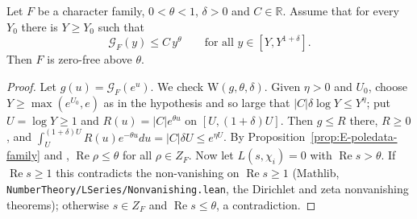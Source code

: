 
\begin{theorem}\label{pn:P023}

\par{}\par
Let $F$ be a character family, $0<\theta<1$, $\delta>0$ and $C\in\mathbb R$. Assume that for every
$Y_0$ there is $Y\ge Y_0$ such that
\[
\mathcal G_F(y)\le C\,y^{\theta}\qquad\text{for all }y\in[Y,Y^{1+\delta}].
\]
Then $F$ is zero-free above $\theta$.
\end{theorem}
\begin{proof}
Let $g(u)=\mathcal G_F(e^{u})$. We check $\mathrm W(g,\theta,\delta)$. Given $\eta>0$ and $U_0$,
choose $Y\ge\max(e^{U_0},e)$ as in the hypothesis and so large that
$|C|\delta\log Y\le Y^{\eta}$; put $U=\log Y\ge1$ and $R(u)=|C|e^{\theta u}$ on $[U,(1+\delta)U]$.
Then $g\le R$ there, $R\ge0$, and
$\int_U^{(1+\delta)U}R(u)e^{-\theta u}du=|C|\delta U\le e^{\eta U}$. By
Proposition~\ref{prop:E-poledata-family} and ,
$\operatorname{Re}\rho\le\theta$ for all $\rho\in Z_F$. Now let $L(s,\chi_i)=0$ with
$\operatorname{Re}s>\theta$. If $\operatorname{Re}s\ge1$ this contradicts the non-vanishing on
$\operatorname{Re}s\ge1$ (Mathlib, \nolinkurl{NumberTheory/LSeries/Nonvanishing.lean}, the Dirichlet and zeta nonvanishing theorems); otherwise $s\in Z_F$ and
$\operatorname{Re}s\le\theta$, a contradiction.

\end{proof}
